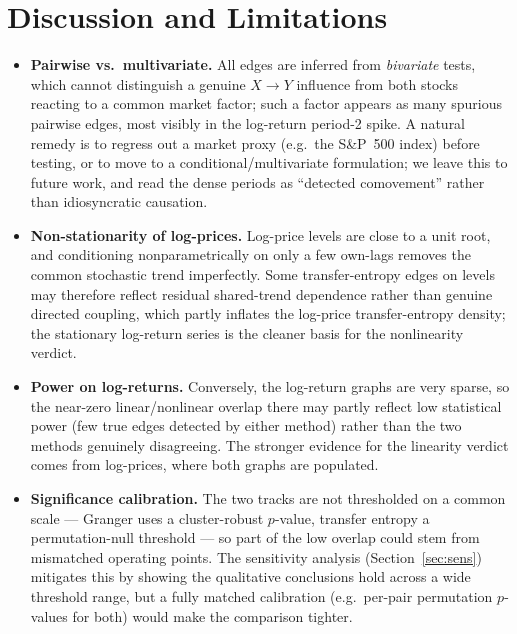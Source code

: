 \documentclass[11pt,a4paper]{article}
\begin{document}
\section{Discussion and Limitations}\label{sec:discussion}
\begin{itemize}
  \item \textbf{Pairwise vs.\ multivariate.} All edges are inferred from
        \emph{bivariate} tests, which cannot distinguish a genuine $X\!\to\!Y$
        influence from both stocks reacting to a common market factor; such a
        factor appears as many spurious pairwise edges, most visibly in the
        log-return period-2 spike. A natural remedy is to regress out a market
        proxy (e.g.\ the S\&P~500 index) before testing, or to move to a
        conditional/multivariate formulation; we leave this to future work, and
        read the dense periods as ``detected comovement'' rather than
        idiosyncratic causation.
  \item \textbf{Non-stationarity of log-prices.} Log-price levels are close to a
        unit root, and conditioning nonparametrically on only a few own-lags
        removes the common stochastic trend imperfectly. Some transfer-entropy
        edges on levels may therefore reflect residual shared-trend dependence
        rather than genuine directed coupling, which partly inflates the log-price
        transfer-entropy density; the stationary log-return series is the cleaner
        basis for the nonlinearity verdict.
  \item \textbf{Power on log-returns.} Conversely, the log-return graphs are very
        sparse, so the near-zero linear/nonlinear overlap there may partly reflect
        low statistical power (few true edges detected by either method) rather
        than the two methods genuinely disagreeing. The stronger evidence for the
        linearity verdict comes from log-prices, where both graphs are populated.
  \item \textbf{Significance calibration.} The two tracks are not thresholded on a
        common scale --- Granger uses a cluster-robust $p$-value, transfer entropy
        a permutation-null threshold --- so part of the low overlap could stem from
        mismatched operating points. The sensitivity analysis
        (Section~\ref{sec:sens}) mitigates this by showing the qualitative
        conclusions hold across a wide threshold range, but a fully matched
        calibration (e.g.\ per-pair permutation $p$-values for both) would make the
        comparison tighter.
\end{itemize}
\end{document}
